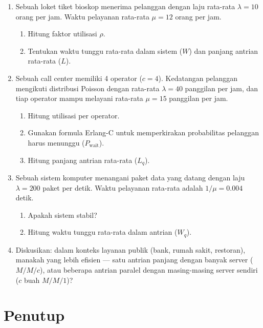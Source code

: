 \documentclass{bukumjh}
\begin{document}
\begin{enumerate}
    \item Sebuah loket tiket bioskop menerima pelanggan dengan laju rata-rata $\lambda = 10$ orang per jam. Waktu pelayanan rata-rata $\mu = 12$ orang per jam.  
    \begin{enumerate}
        \item Hitung faktor utilisasi $\rho$.  
        \item Tentukan waktu tunggu rata-rata dalam sistem ($W$) dan panjang antrian rata-rata ($L$).  
    \end{enumerate}

    \item Sebuah call center memiliki 4 operator ($c=4$). Kedatangan pelanggan mengikuti distribusi Poisson dengan rata-rata $\lambda = 40$ panggilan per jam, dan tiap operator mampu melayani rata-rata $\mu = 15$ panggilan per jam.  
    \begin{enumerate}
        \item Hitung utilisasi per operator.  
        \item Gunakan formula Erlang-C untuk memperkirakan probabilitas pelanggan harus menunggu ($P_{\text{wait}}$).  
        \item Hitung panjang antrian rata-rata ($L_q$).  
    \end{enumerate}

    \item Sebuah sistem komputer menangani paket data yang datang dengan laju $\lambda = 200$ paket per detik. Waktu pelayanan rata-rata adalah $1/\mu = 0.004$ detik.  
    \begin{enumerate}
        \item Apakah sistem stabil?  
        \item Hitung waktu tunggu rata-rata dalam antrian ($W_q$).  
    \end{enumerate}

    \item Diskusikan: dalam konteks layanan publik (bank, rumah sakit, restoran), manakah yang lebih efisien — satu antrian panjang dengan banyak server ($M/M/c$), atau beberapa antrian paralel dengan masing-masing server sendiri ($c$ buah $M/M/1$)?
\end{enumerate}

\section{Penutup}
\end{document}
